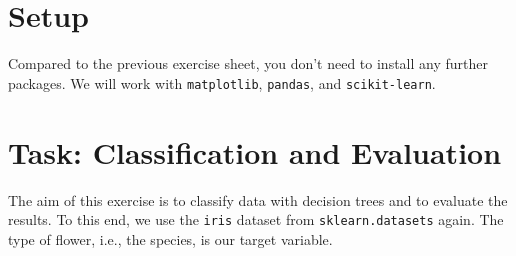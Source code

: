 \documentclass[12pt]{article}
\newcommand{\code}[1]{\textcolor{kitgreen}{\texttt{#1}}}
\begin{document}
\section*{Setup}

Compared to the previous exercise sheet, you don't need to install any further packages.
We will work with \code{matplotlib}, \code{pandas}, and \code{scikit-learn}.

\section*{Task: Classification and Evaluation}

The aim of this exercise is to classify data with decision trees and to evaluate the results.
To this end, we use the \code{iris} dataset from \code{sklearn.datasets} again.
The type of flower, i.e., the species, is our target variable.
\end{document}
